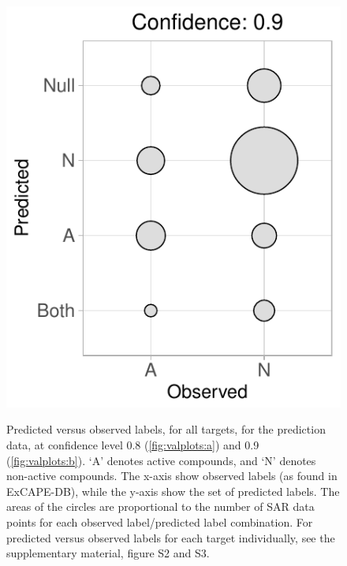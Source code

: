 \documentclass[utf8]{frontiersSCNS} %
\begin{document}
\begin{figure}[h!]
\begin{minipage}[c]{0.38\textwidth}
{        \includegraphics[width=1\textwidth]{figures/fig4b_alltargets_0p9_valplot.pdf}
    }\label{fig:valplots:b}
\end{minipage}
    \caption{Predicted versus observed labels, for all targets, for the
    prediction data, at confidence level 0.8 (\ref{fig:valplots:a}) and 0.9
    (\ref{fig:valplots:b}). `A' denotes active compounds, and `N' denotes
    non-active compounds. The x-axis show observed labels (as found in ExCAPE-DB),
    while the y-axis show the set of predicted labels. The areas of the
    circles are proportional to the number of SAR data points for each
    observed label/predicted label combination. For predicted versus observed
    labels for each target individually, see the supplementary material,
    figure S2 and S3.}
    \label{fig:valplots}
\end{figure}
\end{document}
